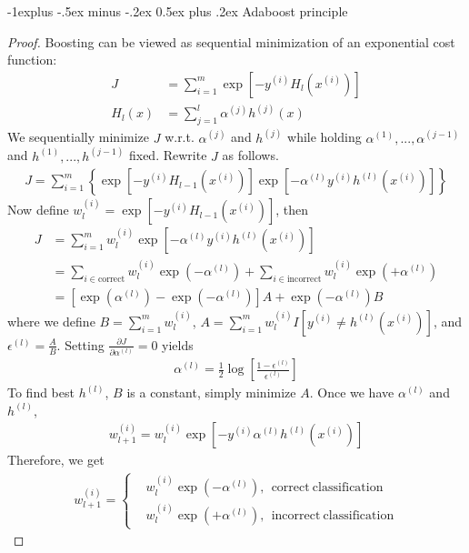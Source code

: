 \documentclass[8pt,landscape]{article}
\makeatletter
\renewcommand{\subsection}{\@startsection{subsection}{2}{0mm}%
                                {-1explus -.5ex minus -.2ex}%
                                {0.5ex plus .2ex}%
                                {\normalfont\small\bfseries}}
\makeatother
\begin{document}
\begin{multicols}{3}
\subsection{Adaboost principle}
\begin{proof}
	Boosting can be viewed as sequential minimization of an exponential cost function:
	\begin{align*}
		J &= \sum_{i=1}^m \exp{\left[ -y^{(i)} H_l(x^{(i)}) \right]}\\
		H_l(x) &= \sum_{j=1}^l \alpha^{(j)} h^{(j)}(x)
	\end{align*}
	We sequentially minimize $J$ w.r.t. $\alpha^{(j)}$ and $h^{(j)}$ while holding $\alpha^{(1)}, ..., \alpha^{(j-1)}$ and $h^{(1)}, ..., h^{(j-1)}$ fixed. Rewrite $J$ as follows.
	\begin{align*}
		J = \sum_{i=1}^m \left\{ \exp{\left[ -y^{(i)} H_{l-1}(x^{(i)}) \right]} \exp{\left[ -\alpha^{(l)} y^{(i)} h^{(l)}(x^{(i)}) \right]} \right\}
	\end{align*}
	Now define $w_l^{(i)} = \exp{\left[ -y^{(i)} H_{l-1}(x^{(i)}) \right]}$, then
	\begin{align*}
		J &= \sum_{i=1}^m w_l^{(i)} \exp{\left[ -\alpha^{(l)} y^{(i)} h^{(l)}(x^{(i)}) \right]}\\
		&= \sum_{i \in \mathrm{correct}} w_l^{(i)} \exp{\left( -\alpha^{(l)} \right)} + \sum_{i \in \mathrm{incorrect}} w_l^{(i)} \exp{\left( +\alpha^{(l)} \right)}\\
		&= \left[ \exp{\left( \alpha^{(l)} \right)} - \exp{\left( -\alpha^{(l)} \right)} \right] A + \exp{\left( -\alpha^{(l)} \right)} B
	\end{align*}
	where we define $B = \sum_{i=1}^m w_l^{(i)}$, $A = \sum_{i=1}^m w_l^{(i)} I \left[ y^{(i)} \neq h^{(l)}(x^{(i)}) \right]$, and $\epsilon^{(l)} = \frac{A}{B}$. Setting $\frac{\partial J}{\partial \alpha^{(l)}} = 0$ yields
	\begin{align*}
		\alpha^{(l)} = \frac{1}{2}\log{ \left[ \frac{1 - \epsilon^{(l)}}{\epsilon^{(l)}} \right] }
	\end{align*}
	To find best $h^{(l)}$, $B$ is a constant, simply minimize $A$. Once we have $\alpha^{(l)}$ and $h^{(l)}$,
	\begin{align*}
		w_{l+1}^{(i)} = w_l^{(i)} \exp{ \left[ -y^{(i)} \alpha^{(l)} h^{(l)}(x^{(i)}) \right] }
	\end{align*}
	Therefore, we get
	\begin{align*}
		w_{l+1}^{(i)} = \left\{
		\begin{aligned}
			&w_l^{(i)} \exp{\left( -\alpha^{(l)} \right)}, \ \ \mathrm{correct \ classification}\\
			&w_l^{(i)} \exp{\left( +\alpha^{(l)} \right)}, \ \ \mathrm{incorrect \ classification}
		\end{aligned}
		\right.
	\end{align*}
\end{proof}


\end{multicols}
\end{document}
